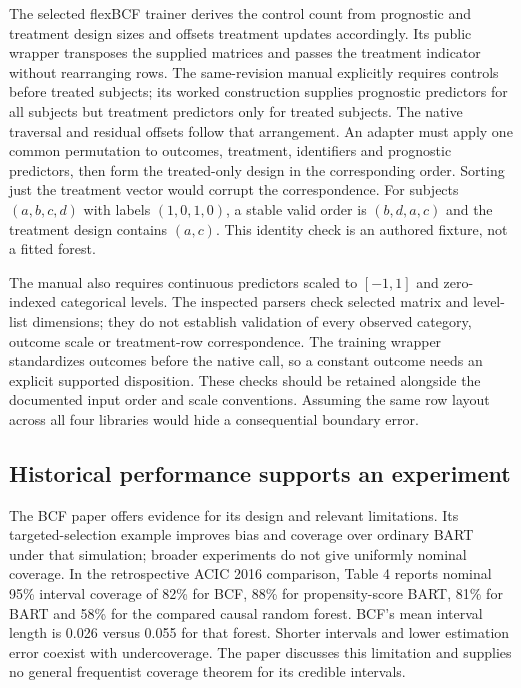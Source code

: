 The selected flexBCF trainer derives the control count from prognostic and treatment design sizes and offsets treatment updates accordingly. Its public wrapper transposes the supplied matrices and passes the treatment indicator without rearranging rows. The same-revision manual explicitly requires controls before treated subjects; its worked construction supplies prognostic predictors for all subjects but treatment predictors only for treated subjects. The native traversal and residual offsets follow that arrangement. An adapter must apply one common permutation to outcomes, treatment, identifiers and prognostic predictors, then form the treated-only design in the corresponding order. Sorting just the treatment vector would corrupt the correspondence. For subjects $(a,b,c,d)$ with labels $(1,0,1,0)$, a stable valid order is $(b,d,a,c)$ and the treatment design contains $(a,c)$. This identity check is an authored fixture, not a fitted forest.~\citep{exec21_cxx_flexbcf,rel16flexcallers,rel16flexwitnesses}

The manual also requires continuous predictors scaled to $[-1,1]$ and zero-indexed categorical levels. The inspected parsers check selected matrix and level-list dimensions; they do not establish validation of every observed category, outcome scale or treatment-row correspondence. The training wrapper standardizes outcomes before the native call, so a constant outcome needs an explicit supported disposition. These checks should be retained alongside the documented input order and scale conventions. Assuming the same row layout across all four libraries would hide a consequential boundary error.~\citep{exec21_cxx_flexbcf,rel16flexcallers}

\subsection{Historical performance supports an experiment}
\label{exec21:cxx-evidence}
The BCF paper offers evidence for its design and relevant limitations. Its targeted-selection example improves bias and coverage over ordinary BART under that simulation; broader experiments do not give uniformly nominal coverage. In the retrospective ACIC 2016 comparison, Table 4 reports nominal 95\% interval coverage of 82\% for BCF, 88\% for propensity-score BART, 81\% for BART and 58\% for the compared causal random forest. BCF's mean interval length is 0.026 versus 0.055 for that forest. Shorter intervals and lower estimation error coexist with undercoverage. The paper discusses this limitation and supplies no general frequentist coverage theorem for its credible intervals.~\citep{exec21_cxx_hahn}


